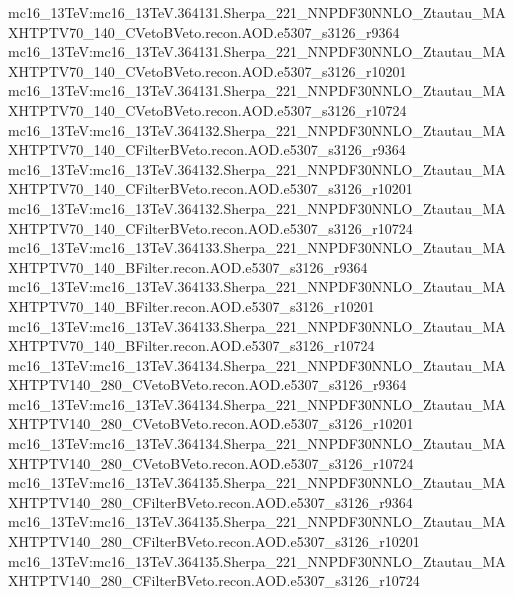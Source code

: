 { mc16\_13TeV:mc16\_13TeV.364131.Sherpa\_221\_NNPDF30NNLO\_Ztautau\_MAXHTPTV70\_140\_CVetoBVeto.recon.AOD.e5307\_s3126\_r9364   \newline 
 mc16\_13TeV:mc16\_13TeV.364131.Sherpa\_221\_NNPDF30NNLO\_Ztautau\_MAXHTPTV70\_140\_CVetoBVeto.recon.AOD.e5307\_s3126\_r10201 \newline 
 mc16\_13TeV:mc16\_13TeV.364131.Sherpa\_221\_NNPDF30NNLO\_Ztautau\_MAXHTPTV70\_140\_CVetoBVeto.recon.AOD.e5307\_s3126\_r10724 \newline   
 mc16\_13TeV:mc16\_13TeV.364132.Sherpa\_221\_NNPDF30NNLO\_Ztautau\_MAXHTPTV70\_140\_CFilterBVeto.recon.AOD.e5307\_s3126\_r9364 \newline   
 mc16\_13TeV:mc16\_13TeV.364132.Sherpa\_221\_NNPDF30NNLO\_Ztautau\_MAXHTPTV70\_140\_CFilterBVeto.recon.AOD.e5307\_s3126\_r10201  \newline  
 mc16\_13TeV:mc16\_13TeV.364132.Sherpa\_221\_NNPDF30NNLO\_Ztautau\_MAXHTPTV70\_140\_CFilterBVeto.recon.AOD.e5307\_s3126\_r10724\newline    
 mc16\_13TeV:mc16\_13TeV.364133.Sherpa\_221\_NNPDF30NNLO\_Ztautau\_MAXHTPTV70\_140\_BFilter.recon.AOD.e5307\_s3126\_r9364 \newline   
 mc16\_13TeV:mc16\_13TeV.364133.Sherpa\_221\_NNPDF30NNLO\_Ztautau\_MAXHTPTV70\_140\_BFilter.recon.AOD.e5307\_s3126\_r10201\newline    
 mc16\_13TeV:mc16\_13TeV.364133.Sherpa\_221\_NNPDF30NNLO\_Ztautau\_MAXHTPTV70\_140\_BFilter.recon.AOD.e5307\_s3126\_r10724   \newline 
 mc16\_13TeV:mc16\_13TeV.364134.Sherpa\_221\_NNPDF30NNLO\_Ztautau\_MAXHTPTV140\_280\_CVetoBVeto.recon.AOD.e5307\_s3126\_r9364  \newline  
 mc16\_13TeV:mc16\_13TeV.364134.Sherpa\_221\_NNPDF30NNLO\_Ztautau\_MAXHTPTV140\_280\_CVetoBVeto.recon.AOD.e5307\_s3126\_r10201 \newline  
 mc16\_13TeV:mc16\_13TeV.364134.Sherpa\_221\_NNPDF30NNLO\_Ztautau\_MAXHTPTV140\_280\_CVetoBVeto.recon.AOD.e5307\_s3126\_r10724 \newline   
 mc16\_13TeV:mc16\_13TeV.364135.Sherpa\_221\_NNPDF30NNLO\_Ztautau\_MAXHTPTV140\_280\_CFilterBVeto.recon.AOD.e5307\_s3126\_r9364\newline   
 mc16\_13TeV:mc16\_13TeV.364135.Sherpa\_221\_NNPDF30NNLO\_Ztautau\_MAXHTPTV140\_280\_CFilterBVeto.recon.AOD.e5307\_s3126\_r10201 \newline  
 mc16\_13TeV:mc16\_13TeV.364135.Sherpa\_221\_NNPDF30NNLO\_Ztautau\_MAXHTPTV140\_280\_CFilterBVeto.recon.AOD.e5307\_s3126\_r10724 \newline  
}
